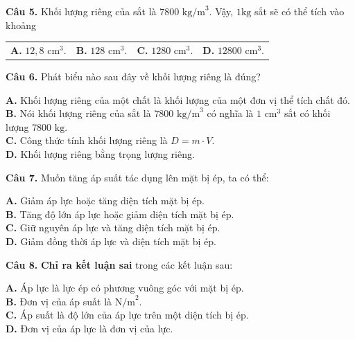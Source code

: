 \documentclass{article}
\begin{document}
\fontsize{25}{33}\selectfont
\textbf{Câu 5.} Khối lượng riêng của sắt là $7800\text{ kg/m}^3$. Vậy, $1\text{kg}$ sắt sẽ có thể tích vào khoảng
\vspace{6pt}

\begin{tabularx}{\linewidth}{@{}X X X X@{}}
\textbf{A.} $12,8\text{ cm}^3$. & \textbf{B.} $128\text{ cm}^3$. & \textbf{C.} $1280\text{ cm}^3$. & \textbf{D.} $12800\text{ cm}^3$.
\end{tabularx}

\vspace*{\fill}

\textbf{Câu 6.} Phát biểu nào sau đây về khối lượng riêng là đúng?
\vspace{6pt}

\textbf{A.} Khối lượng riêng của một chất là khối lượng của một đơn vị thể tích chất đó.\\
\textbf{B.} Nói khối lượng riêng của sắt là $7800\text{ kg/m}^3$ có nghĩa là $1\text{ cm}^3$ sắt có khối lượng $7800\text{ kg}$.\\
\textbf{C.} Công thức tính khối lượng riêng là $D = m \cdot V$.\\
\textbf{D.} Khối lượng riêng bằng trọng lượng riêng.
\vspace*{\fill}
\newpage

\fontsize{25}{33}\selectfont
\textbf{Câu 7.} Muốn tăng áp suất tác dụng lên mặt bị ép, ta có thể:
\vspace{6pt}

\textbf{A.} Giảm áp lực hoặc tăng diện tích mặt bị ép.\\
\textbf{B.} Tăng độ lớn áp lực hoặc giảm diện tích mặt bị ép.\\
\textbf{C.} Giữ nguyên áp lực và tăng diện tích mặt bị ép.\\
\textbf{D.} Giảm đồng thời áp lực và diện tích mặt bị ép.

\vspace*{\fill}

\textbf{Câu 8.} \textbf{Chỉ ra kết luận sai} trong các kết luận sau:
\vspace{6pt}

\textbf{A.} Áp lực là lực ép có phương vuông góc với mặt bị ép.\\
\textbf{B.} Đơn vị của áp suất là $\text{N/m}^2$.\\
\textbf{C.} Áp suất là độ lớn của áp lực trên một diện tích bị ép.\\
\textbf{D.} Đơn vị của áp lực là đơn vị của lực.
\vspace*{\fill}
\newpage
\end{document}
